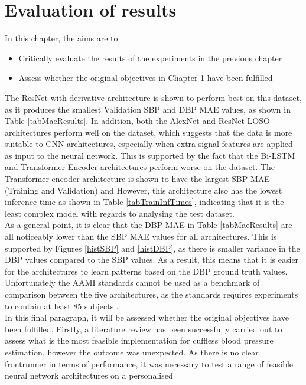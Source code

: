\section{Evaluation of results}
In this chapter, the aims are to:
\begin{itemize}
    \item Critically evaluate the results of the experiments in the previous chapter
    \item Assess whether the original objectives in Chapter 1 have been fulfilled
\end{itemize}\noindent The ResNet with derivative architecture is shown to perform best on this dataset, as 
it produces the smallest Validation SBP and DBP MAE values, as shown in Table \ref{tabMaeResults}. In addition, both the 
AlexNet and ResNet-LOSO architectures perform well on the dataset, which suggests that 
the data is more suitable to CNN architectures, especially when extra signal features are applied as input to the neural network. This is supported by the fact that the Bi-LSTM and Transformer Encoder 
architectures perform worse on the dataset. The Transformer encoder architecture is shown to have the largest SBP MAE (Training and Validation) and 
However, this architecture also has the lowest inference time as shown in Table \ref{tabTrainInfTimes}, indicating 
that it is the least complex model with regards to analysing the test dataset.\\ \newline \noindent As a general point, it is clear that the DBP MAE in Table \ref{tabMaeResults} are all noticeably lower than the SBP MAE values for all architectures. This 
is supported by Figures \ref{histSBP} and \ref{histDBP}, as there is smaller variance in the DBP values compared to the SBP values. As a result, 
this means that it is easier for the architectures to learn patterns based on the DBP ground truth values. Unfortunately the AAMI standards cannot be used as a benchmark of comparison between the five 
architectures, as the standards requires experiments to contain at least 85 subjects \cite{aami}.\\ \newline \noindent In this final paragraph, it will be assessed whether the original objectives have been fulfilled. Firstly, 
a literature review has been successfully carried out to assess what is the most feasible implementation 
for cuffless blood pressure estimation, however the outcome was unexpected. As there is no clear frontrunner 
in terms of performance, it was necessary to test a range of feasible neural network architectures on a personalised 
